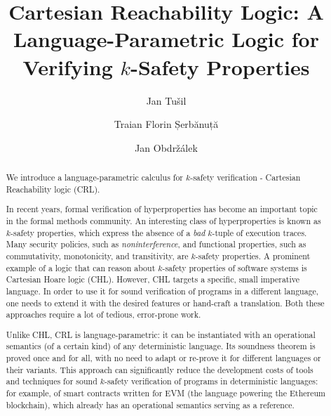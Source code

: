 \documentclass{easychair}
\title{Cartesian Reachability Logic: A Language-Parametric Logic for Verifying $k$-Safety Properties}
\author{
  Jan Tu\v{s}il \inst{1}
  \and Traian Florin Șerbănuță  \inst{2}
  \and Jan Obdržálek \inst{1}
}
\institute{
  Masaryk University,
  Brno, Czech Republic\\
  \email{jan.tusil@mail.muni.cz,obdrzalek@fi.muni.cz}
\and
   University of Bucharest,
   Bucharest, Romania\\
   \email{traian.serbanuta@unibuc.ro}\\
 }
\begin{document}
\maketitle


\begin{abstract}

  We introduce a language-parametric calculus
  for $k$-safety verification - Cartesian Reachability logic (CRL).

  In recent years, formal verification of hyperproperties has become an
  important topic in the formal methods community.  An interesting class of
  hyperproperties is known as $k$-safety properties, which express the absence
  of a \emph{bad} $k$-tuple of execution traces.  Many security policies, such
  as \emph{noninterference}, and functional properties, such as commutativity,
  monotonicity, and transitivity, are $k$-safety properties. A prominent example
  of a logic that can reason about $k$-safety properties of software systems
  is Cartesian Hoare logic (CHL). However, CHL targets a specific, small
  imperative language. In order to use it for sound verification of programs
  in a different language, one needs to extend it with the desired features
  or hand-craft a translation. Both these approaches require a lot of
  tedious, error-prone work.

  Unlike CHL, CRL is language-parametric:
  it can be instantiated with an operational semantics (of a certain kind) of any
  deterministic language. %
  Its soundness theorem is proved once and for all, with no need to adapt or re-prove it
  for different languages or their variants.
  This approach
  can significantly reduce
  the development costs of tools and techniques for sound $k$-safety
  verification of programs in deterministic languages: for example,
  of smart contracts written for EVM (the language powering the Ethereum blockchain),
  which already has an operational semantics serving as a reference.
  

  

\end{abstract}
\end{document}
